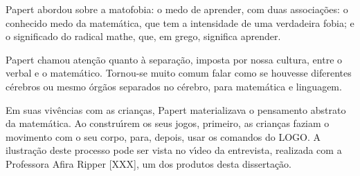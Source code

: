 \documentclass[
12pt,		%
openright,	%
twoside,  %
a4paper,			%
chapter=TITLE,		%
english,			%
french,				%
spanish,			%
brazil				%
]{USPSC-classe/USPSC}
\begin{document}
Papert abordou sobre a \textquotedbl matofobia: o medo de aprender\textquotedbl , com duas associa\c{c}\~oes: o conhecido medo da matem\'atica, que tem a intensidade de uma verdadeira fobia; e o  significado do radical mathe, que, em grego, significa aprender.











\noindent\begin{center}\mbox{\centering{}}\end{center}


Papert chamou aten\c{c}\~ao quanto \`a separa\c{c}\~ao, imposta por nossa cultura, entre o verbal e o matem\'atico. Tornou-se muito comum falar como se houvesse diferentes c\'erebros ou mesmo \'org\~aos separados no c\'erebro, para matem\'atica e linguagem.










Em suas viv\^encias com as crian\c{c}as, Papert materializava o pensamento abstrato da matem\'atica. Ao constru\'{\i}rem os seus jogos, primeiro, as crian\c{c}as faziam o movimento com o seu corpo, para, depois, usar os comandos do LOGO. A ilustra\c{c}\~ao deste processo pode ser vista no v\'{\i}deo  da entrevista, realizada com a Professora Afira Ripper [XXX],  um dos produtos desta disserta\c{c}\~ao.
\end{document}
